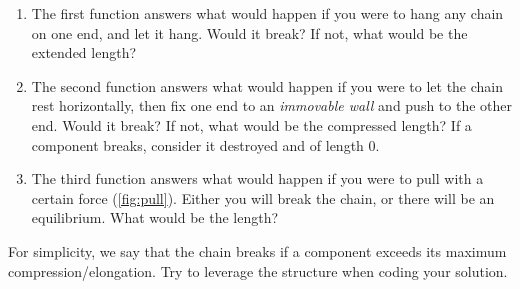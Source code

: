 \begin{gradedexercise}
\begin{enumerate}
              \begin{enumerate}
                  \item The first function answers what would happen if you were to hang any cha{}in on one end, and let it hang.
                        Would it break?
                        If not, what would be the extended length?
                  \item The second function answers what would happen if you were to let the cha{}in rest horizontally, then fix one end to an \emph{immovable wall} and push to the other end.
                        Would it break?
                        If not, what would be the compressed length?
                        If a component breaks, consider it destroyed and of length 0.
                  \item The third function answers what would happen if you were to pull with a certain force (\cref{fig:pull}).
                        Either you will break the cha{}in, or there will be an equilibrium.
                        What would be the length?
              \end{enumerate}

              \begin{hint}
                  For simplicity, we say that the cha{}in breaks if a component exceeds its maximum compression/elongation.
                  Try to leverage the  structure when coding your solution.
              \end{hint}
    \end{enumerate}
\end{gradedexercise}



